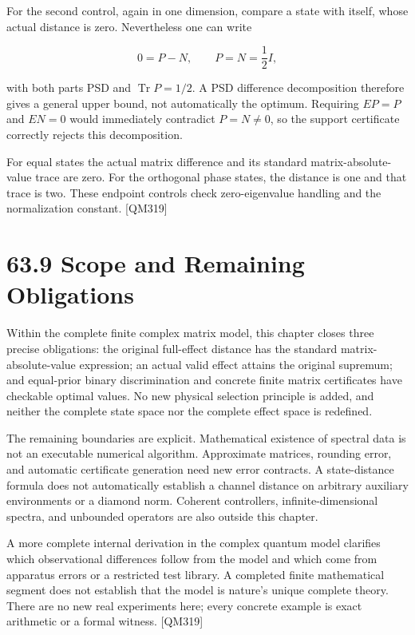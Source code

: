 \documentclass[
  11pt,
  oneside]{book}
\begin{document}
For the second control, again in one dimension, compare a state with
itself, whose actual distance is zero. Nevertheless one can write

\[
0=P-N,\qquad P=N=\frac12I,
\]

with both parts PSD and \(\operatorname{Tr}P=1/2\). A PSD difference
decomposition therefore gives a general upper bound, not automatically
the optimum. Requiring \(EP=P\) and \(EN=0\) would immediately
contradict \(P=N\ne0\), so the support certificate correctly rejects
this decomposition.

For equal states the actual matrix difference and its standard
matrix-absolute-value trace are zero. For the orthogonal phase states,
the distance is one and that trace is two. These endpoint controls check
zero-eigenvalue handling and the normalization constant. {[}QM319{]}

\section{63.9 Scope and Remaining Obligations}

Within the complete finite complex matrix model, this chapter closes
three precise obligations: the original full-effect distance has the
standard matrix-absolute-value expression; an actual valid effect
attains the original supremum; and equal-prior binary discrimination and
concrete finite matrix certificates have checkable optimal values. No
new physical selection principle is added, and neither the complete
state space nor the complete effect space is redefined.

The remaining boundaries are explicit. Mathematical existence of
spectral data is not an executable numerical algorithm. Approximate
matrices, rounding error, and automatic certificate generation need new
error contracts. A state-distance formula does not automatically
establish a channel distance on arbitrary auxiliary environments or a
diamond norm. Coherent controllers, infinite-dimensional spectra, and
unbounded operators are also outside this chapter.

A more complete internal derivation in the complex quantum model
clarifies which observational differences follow from the model and
which come from apparatus errors or a restricted test library. A
completed finite mathematical segment does not establish that the model
is nature's unique complete theory. There are no new real experiments
here; every concrete example is exact arithmetic or a formal witness.
{[}QM319{]}
\end{document}
